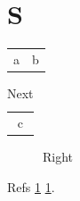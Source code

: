 \documentclass{article}
\begin{document}
\section{S}
\begin{table}[h]
\begin{longtable}{cc} a & b \\ \end{longtable}
\end{table}
\begin{table}[h]
\caption{Next}\label{nx}
\begin{tabular}{c} c \end{tabular}
\end{table}
\begin{figure}[h]
\begin{minipage}{0.45\linewidth}\centering
{}
\end{minipage}\hfill
\begin{minipage}{0.45\linewidth}\centering
{}
\caption{Right}\label{lf}
\end{minipage}
\end{figure}
Refs \ref{nx} \ref{lf}.
\end{document}
